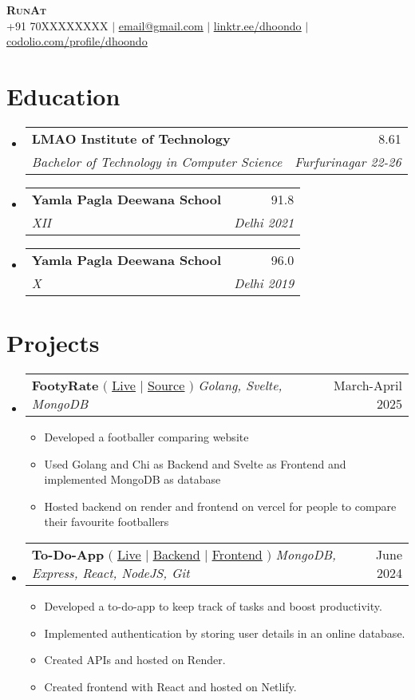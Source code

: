 \documentclass[letterpaper,11pt]{article}
\makeatletter
\newcommand{\resumeItem}[1]{
  \item\small{
    {#1 \vspace{-2pt}}
  }
}
\newcommand{\resumeSubheading}[4]{
  \vspace{-2pt}\item
    \begin{tabular*}{0.97\textwidth}[t]{l@{\extracolsep{\fill}}r}
      \textbf{#1} & #2 \\
      \textit{\small#3} & \textit{\small #4} \\
    \end{tabular*}\vspace{-7pt}
}
\newcommand{\resumeProjectHeading}[2]{
    \item
    \begin{tabular*}{0.97\textwidth}{l@{\extracolsep{\fill}}r}
      \small#1 & #2 \\
    \end{tabular*}\vspace{-7pt}
}
\newcommand{\resumeSubHeadingListStart}{\begin{itemize}[leftmargin=0.15in, label={}]}
\newcommand{\resumeSubHeadingListEnd}{\end{itemize}}
\newcommand{\resumeItemListStart}{\begin{itemize}}
\newcommand{\resumeItemListEnd}{\end{itemize}\vspace{-5pt}}
\makeatother
\begin{document}

\begin{center}
    \textbf{\Huge \scshape RunAt} \\ \vspace{1pt}
    \small +91 70XXXXXXXX $|$ \href{mailto:x@x.com}{\underline{email@gmail.com}} $|$
    \href{https://linktr.ee/dhoondo}{\underline{linktr.ee/dhoondo}} $|$
    \href{https://codolio.com/profile/runat}{{\underline{codolio.com/profile/dhoondo}}} 
\end{center}

\section{Education}
  \resumeSubHeadingListStart
    \resumeSubheading
      {LMAO Institute of Technology}{8.61}
      {Bachelor of Technology in Computer Science}{Furfurinagar 22-26} 
    \resumeSubheading
      {Yamla Pagla Deewana School}{91.8}
      {XII}{Delhi 2021}
    \resumeSubheading
      {Yamla Pagla Deewana School}{96.0}
      {X}{Delhi 2019}
  \resumeSubHeadingListEnd

\section{Projects}
    \resumeSubHeadingListStart
      \resumeProjectHeading
          {\textbf{FootyRate} $($
          {\href{https://footyrate.vercel.app/}{\underline{Live}}} $|$ 
          {\href{https://github.com/RunAtTekky/footyrate}{\underline{Source}}} $)$ \emph{Golang, Svelte, MongoDB}}{March-April 2025}
          \resumeItemListStart
            \resumeItem{Developed a footballer comparing website}
            \resumeItem{Used Golang and Chi as Backend and Svelte as Frontend and implemented MongoDB as database}
            \resumeItem{Hosted backend on render and frontend on vercel for people to compare their favourite footballers}
          \resumeItemListEnd
      \resumeProjectHeading
          {\textbf{To-Do-App} $($
          {\href{https://kaamkarbhai.netlify.app/}{\underline{Live}}} $|$ 
          {\href{https://github.com/RunAtTekky/to-do-app}{\underline{Backend}}} $|$
          {\href{https://github.com/RunAtTekky/react-to-do-app}{\underline{Frontend}}} $)$ \emph{ MongoDB, Express,  React, NodeJS, Git}}{June 2024}
          \resumeItemListStart
            \resumeItem{Developed a to-do-app to keep track of tasks and boost productivity.}
            \resumeItem{Implemented authentication by storing user details in an online database.}
            \resumeItem{Created APIs and hosted on Render.}
            \resumeItem{Created frontend with React and hosted on Netlify.}
          \resumeItemListEnd
    \resumeSubHeadingListEnd
\end{document}
